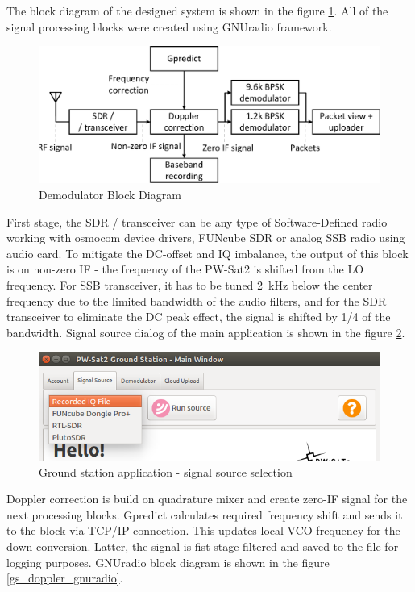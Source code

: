 The block diagram of the designed system is shown in the figure \ref{demodulator_block_diagram}. All of the signal processing blocks were created using GNUradio framework.

\begin{figure}
    \centering
    \includegraphics[width=0.6\paperwidth]{img/7/demodulator_block_diagram.pdf}
    \caption{Demodulator Block Diagram}
    \label{demodulator_block_diagram}
\end{figure}

First stage, the SDR / transceiver can be any type of Software-Defined radio working with osmocom device drivers, FUNcube SDR or analog SSB radio using audio card. To mitigate the DC-offset and IQ imbalance, the output of this block is on non-zero IF - the frequency of the PW-Sat2 is shifted from the LO frequency. For SSB transceiver, it has to be tuned \SI{2}{\kHz} below the center frequency due to the limited bandwidth of the audio filters, and for the SDR transceiver to eliminate the DC peak effect, the signal is shifted by 1/4 of the bandwidth. Signal source dialog of the main application is shown in the figure \ref{gs_source_selection}.

\begin{figure}
    \centering
    \includegraphics[width=0.6\paperwidth]{img/7/gs_source_selection.png}
    \caption{Ground station application - signal source selection}
    \label{gs_source_selection}
\end{figure}

Doppler correction is build on quadrature mixer and create zero-IF signal for the next processing blocks. Gpredict calculates required frequency shift and sends it to the block via TCP/IP connection. This updates local VCO frequency for the down-conversion. Latter, the signal is fist-stage filtered and saved to the file for logging purposes. GNUradio block diagram is shown in the figure \ref{gs_doppler_gnuradio}.

